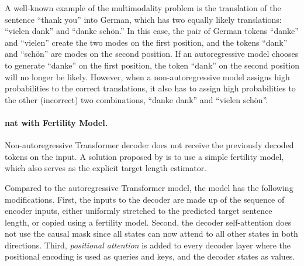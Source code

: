 


A well-known example of the multimodality problem is the translation of the
sentence ``thank you'' into German, which has two equally likely translations:
``vielen dank'' and ``danke schön.'' In this case, the pair of German tokens
``danke'' and ``vielen'' create the two modes on the first position, and the
tokens ``dank'' and ``schön'' are modes on the second position. If an
autoregressive model chooses to generate ``danke'' on the first position, the
token ``dank'' on the second position will no longer be likely. However, when a
non-autoregressive model assigns high probabilities to the correct
translations, it also has to assign high probabilities to the other (incorrect)
two combinations, ``danke dank'' and ``vielen schön''.

\paragraph{\Ac{nat} with Fertility Model.} Non-autoregressive Transformer
decoder does not receive the previously decoded tokens on the input. A solution
proposed by \citet{gu2017nonautoregressive} is to use a simple fertility model,
which also serves as the explicit target length estimator.

Compared to the autoregressive Transformer model, the model has the following
modifications. First, the inputs to the decoder are made up of the sequence of
encoder inputs, either uniformly stretched to the predicted target sentence
length, or copied using a fertility model. Second, the decoder self-attention
does not use the causal mask since all states can now attend to all other
states in both directions. Third, \emph{positional attention} is added to every
decoder layer where the positional encoding is used as queries and keys, and
the decoder states as values.

